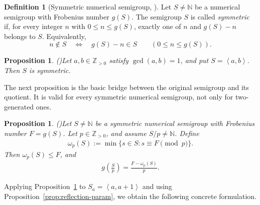 \documentclass[reqno, 12pt]{article}
\numberwithin{equation}{section}
\newtheorem{proposition}[theorem]{Proposition}
\theoremstyle{definition}
\newtheorem{definition}[theorem]{Definition}
\newcommand{\NN}{\mathbb{N}}
\newcommand{\ZZ}{\mathbb{Z}}
\newcommand{\gen}[1]{\left\langle #1\right\rangle}
\begin{document}
\begin{definition}[Symmetric numerical semigroup, \cite{Rosales1996} \cite{Rosales2001}]
Let $S\neq\NN$ be a numerical semigroup with Frobenius number $g(S)$. The semigroup $S$ is called \emph{symmetric} if, for every integer $n$ with $0\le n\le g(S)$, exactly one of $n$ and $g(S)-n$ belongs to $S$.
Equivalently,
\[n\notin S\quad\Longleftrightarrow\quad g(S)-n\in S \qquad(0\le n\le g(S)).\]
\end{definition}


\begin{proposition}{\em (\cite[Corollary 4.7]{J.C.Rosales})}\label{prop:symmetry}
Let $a,b\in\ZZ_{>0}$ satisfy $\gcd(a,b)=1$, and put $S=\gen{a,b}$. Then $S$ is symmetric.
\end{proposition}


The next proposition is the basic bridge between the original semigroup and its quotient.  It is valid for every symmetric numerical semigroup, not only for two-generated ones.

\begin{proposition}{\em (\cite[Corollary 4.4]{F.Strazzanti})}\label{prop:quotient-residue}
Let $S\neq\NN$ be a symmetric numerical semigroup with Frobenius number $F=g(S)$.  Let $p\in\ZZ_{>0}$, and assume $S/p\neq\NN$.  Define
\begin{align*}
\omega_p(S):=\min\{s\in S:s\equiv F\pmod p\}.
\end{align*}
Then $\omega_p(S)\le F$, and
\begin{align*}
g\!\left(\frac{S}{p}\right)=\frac{F-\omega_p(S)}{p}.
\end{align*}
\end{proposition}


Applying Proposition~\ref{prop:quotient-residue} to $S_a=\gen{a,a+1}$ and using Proposition~\ref{prop:reflection-param}, we
obtain the following concrete formulation.
\end{document}
